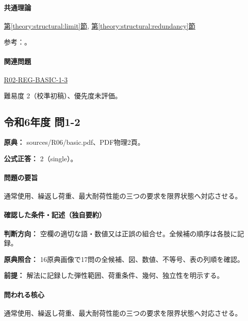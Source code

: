 \paragraph{共通理論} \hyperref[theory:structural:limit]{第\ref*{theory:structural:limit}節}, \hyperref[theory:structural:redundancy]{第\ref*{theory:structural:redundancy}節}

\par 参考：\cite{struct_mit_beam,struct_mit_buckling,struct_mlit_limit}。

\paragraph{関連問題} \hyperref[q:r02-reg-basic-1-3]{R02-REG-BASIC-1-3}

\par 難易度 2（校準初稿）、優先度未評価。

\subsection{令和6年度 問1-2}
\label{q:r06-reg-basic-1-2}

\noindent\textbf{原典：} sources/R06/basic.pdf、PDF物理2頁。

\textbf{公式正答：} 2（single）。

\paragraph{問題の要旨} 通常使用、繰返し荷重、最大耐荷性能の三つの要求を限界状態へ対応させる。

\paragraph{確認した条件・記述（独自要約）}\mbox{}\par

\noindent\textbf{判断方向：} 空欄の適切な語・数値又は正誤の組合せ。全候補の順序は各肢に記録。\par

\noindent\textbf{原典照合：} 16原典画像で17問の全候補、図、数値、不等号、表の列順を確認。\par

\noindent\textbf{前提：} 解法に記録した弾性範囲、荷重条件、幾何、独立性を明示する。\par

\paragraph{問われる核心} 通常使用、繰返し荷重、最大耐荷性能の三つの要求を限界状態へ対応させる。

